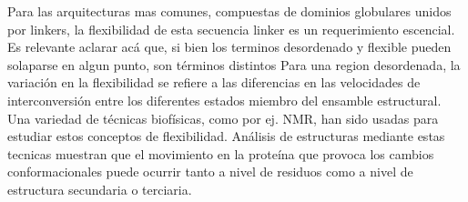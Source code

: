 Para las arquitecturas mas comunes, compuestas de dominios globulares unidos por linkers, la flexibilidad de esta secuencia linker es un requerimiento escencial.
Es relevante aclarar acá que, si bien los terminos desordenado y flexible pueden solaparse en algun punto, son términos distintos\cite{radivojac2004protein}
Para una region desordenada, la variación en la flexibilidad se refiere a las diferencias en las velocidades de interconversión entre los diferentes estados miembro del ensamble estructural.
Una variedad de técnicas biofísicas, como por ej. NMR, han sido usadas para estudiar estos conceptos de flexibilidad.
Análisis de estructuras mediante estas tecnicas muestran que el movimiento en la proteína que provoca los cambios conformacionales puede ocurrir tanto a nivel de residuos como a nivel de estructura secundaria o terciaria. 




% 

